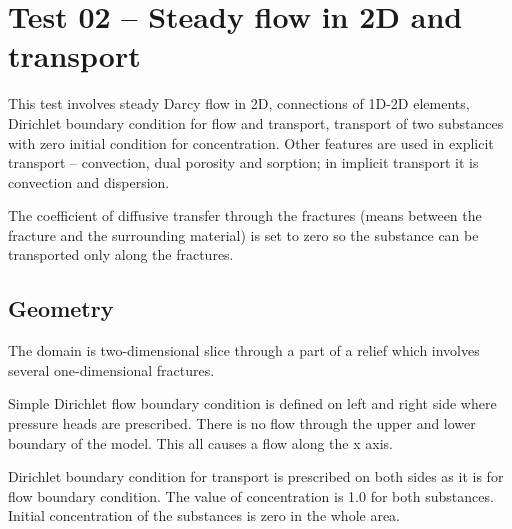 



\section{Test 02 -- Steady flow in 2D and transport}
\label{sec:test02}
This test involves steady Darcy flow in 2D, connections of 1D-2D elements, Dirichlet boundary condition for flow and transport, transport of two substances with zero initial condition for concentration. Other features are used in explicit transport -- convection, dual porosity and sorption; in implicit transport it is convection and dispersion.

The coefficient of diffusive transfer through the fractures (means between the fracture and the surrounding material) is set to zero so the substance can be transported only along the fractures.

\subsection*{Geometry}
The domain is two-dimensional slice through a part of a relief which involves several one-dimensional fractures.

Simple Dirichlet flow boundary condition is defined on left and right side where pressure heads are prescribed. There is no flow through the upper and lower boundary of the model. This all causes a flow along the x axis.

Dirichlet boundary condition for transport is prescribed on both sides as it is for flow boundary condition. The value of concentration is 1.0 for both substances. Initial concentration of the substances is zero in the whole area. 


